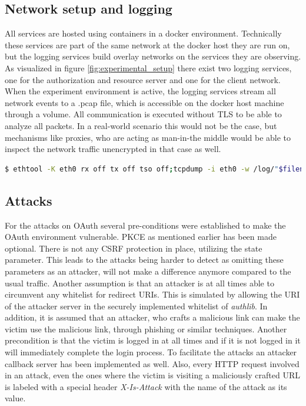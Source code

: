 \documentclass[
    fontsize=12pt,
    headings=small,
    parskip=half,           %
    bibliography=totoc,
    numbers=noenddot,       %
    open=any,               %
    ]{scrreprt}
\begin{document}
\subsection{Network setup and logging}
All services are hosted using containers in a docker environment. Technically these services are part of the same network at the docker host they are run on, but the logging services build overlay networks on the services they are observing. As visualized in figure \ref{fig:experimental_setup} there exist two logging services, one for the authorization and resource server and one for the client network. When the experiment environment is active, the logging services stream all network events to a .pcap file, which is accessible on the docker host machine through a volume. All communication is executed without TLS to be able to analyze all packets. In a real-world scenario this would not be the case, but mechanisms like proxies, who are acting as man-in-the middle would be able to inspect the network traffic unencrypted in that case as well.

\begin{minipage}\linewidth
\begin{lstlisting}[language={bash}, caption={Logger process}, label={lst:logging_service}] 
$ ethtool -K eth0 rx off tx off tso off;tcpdump -i eth0 -w /log/"$filename_prefix"-log-$(date +"%Y%m%d_%H-%M-%S").pcap
\end{lstlisting}
\end{minipage}

\subsection{Attacks}
\label{subsec:attacks}
For the attacks on OAuth several pre-conditions were established to make the OAuth environment vulnerable. PKCE as mentioned earlier has been made optional. There is not any CSRF protection in place, utilizing the state parameter. This leads to the attacks being harder to detect as omitting these parameters as an attacker, will not make a difference anymore compared to the usual traffic. Another assumption is that an attacker is at all times able to circumvent any whitelist for redirect URIs. This is simulated by allowing the URI of the attacker server in the securely implemented whitelist of \emph{authlib}. In addition, it is assumed that an attacker, who crafts a malicious link can make the victim use the malicious link, through phishing or similar techniques. Another precondition is that the victim is logged in at all times and if it is not logged in it will immediately complete the login process. To facilitate the attacks an attacker callback server has been implemented as well. Also, every HTTP request involved in an attack, even the ones where the victim is visiting a maliciously crafted URL is labeled with a special header \emph{X-Is-Attack} with the name of the attack as its value.
\end{document}

